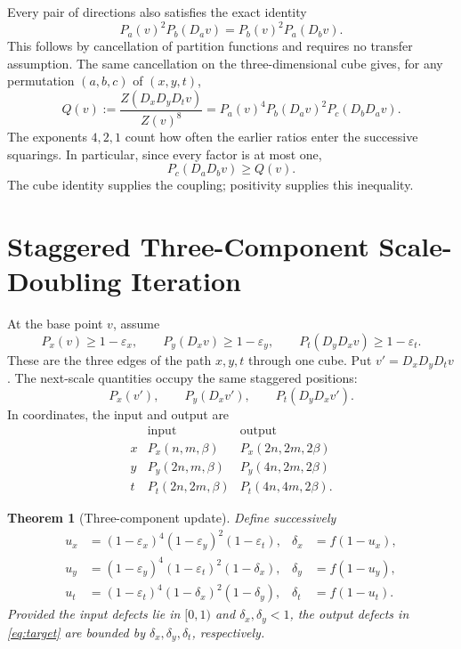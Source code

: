 \documentclass[11pt]{article}
\newcommand{\ee}{\varepsilon}
\newtheorem{theorem}{Theorem}
\begin{document}
Every pair of directions also satisfies the exact identity
\begin{equation}
	P_a(v)^2P_b(D_av)=P_b(v)^2P_a(D_bv).
	\label{eq:face}
\end{equation}
This follows by cancellation of partition functions and requires no
transfer assumption. The same cancellation on the three-dimensional
cube gives, for any permutation \((a,b,c)\) of \((x,y,t)\),
\begin{equation}
	Q(v):=\frac{Z(D_xD_yD_tv)}{Z(v)^8}
	=P_a(v)^4P_b(D_av)^2P_c(D_bD_av).
	\label{eq:cube}
\end{equation}
The exponents \(4,2,1\) count how often the earlier ratios enter the
successive squarings. In particular, since every factor is at most one,
\begin{equation}
	P_c(D_aD_bv)\ge Q(v).
	\label{eq:last-edge}
\end{equation}
The cube identity supplies the coupling; positivity supplies this
inequality.

\section{Staggered Three-Component Scale-Doubling Iteration}

At the base point \(v\), assume
\begin{equation}
	P_x(v)\ge1-\ee_x,\qquad
	P_y(D_xv)\ge1-\ee_y,\qquad
	P_t(D_yD_xv)\ge1-\ee_t.
	\label{eq:seed}
\end{equation}
These are the three edges of the path \(x,y,t\) through one cube.
Put \(v'=D_xD_yD_tv\). The next-scale quantities occupy the same
staggered positions:
\begin{equation}
	P_x(v'),\qquad P_y(D_xv'),\qquad P_t(D_yD_xv').
	\label{eq:target}
\end{equation}
In coordinates, the input and output are
\[
	\begin{array}{c|c|c}
		  & \text{input}     & \text{output}      \\ \hline
		x & P_x(n,m,\beta)   & P_x(2n,2m,2\beta)  \\
		y & P_y(2n,m,\beta)  & P_y(4n,2m,2\beta)  \\
		t & P_t(2n,2m,\beta) & P_t(4n,4m,2\beta).
	\end{array}
\]

\begin{theorem}[Three-component update]
	Define successively
	\begin{align}
		u_x      & =(1-\ee_x)^4(1-\ee_y)^2(1-\ee_t),       &
		\delta_x & =f(1-u_x),\label{eq:update-x}             \\
		u_y      & =(1-\ee_y)^4(1-\ee_t)^2(1-\delta_x),    &
		\delta_y & =f(1-u_y),\label{eq:update-y}             \\
		u_t      & =(1-\ee_t)^4(1-\delta_x)^2(1-\delta_y), &
		\delta_t & =f(1-u_t).\label{eq:update-t}
	\end{align}
	Provided the input defects lie in \([0,1)\) and
	\(\delta_x,\delta_y<1\), the output defects in
	\eqref{eq:target} are bounded by \(\delta_x,\delta_y,\delta_t\),
	respectively.
\end{theorem}
\end{document}
